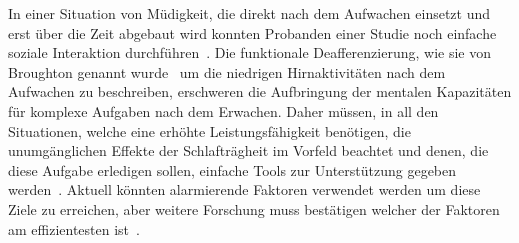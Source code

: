 In einer Situation von Müdigkeit, die direkt nach dem Aufwachen einsetzt und erst über die Zeit abgebaut wird konnten Probanden einer Studie noch einfache soziale Interaktion durchführen~\cite{dinges1990you}. Die funktionale Deafferenzierung, wie sie von Broughton genannt wurde~\cite{broughton1968sleep} um die niedrigen Hirnaktivitäten nach dem Aufwachen zu beschreiben, erschweren die Aufbringung der mentalen Kapazitäten für komplexe Aufgaben nach dem Erwachen. Daher müssen, in all den Situationen, welche eine erhöhte Leistungsfähigkeit benötigen, die unumgänglichen Effekte der Schlafträgheit im Vorfeld beachtet und denen, die diese Aufgabe erledigen sollen, einfache Tools zur Unterstützung gegeben werden~\cite{ferrara2000sleep}. Aktuell könnten alarmierende Faktoren verwendet werden um diese Ziele zu erreichen, aber weitere Forschung muss bestätigen welcher der Faktoren am effizientesten ist~\cite{ferrara2000sleep}.

